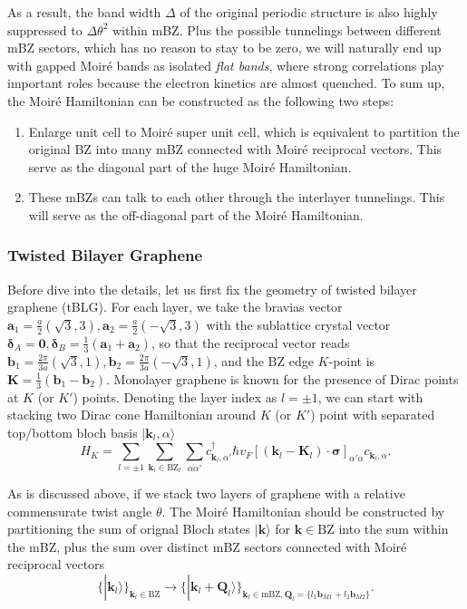 As a result, the band width $\Delta$ of the original periodic structure is also highly suppressed to $\Delta\theta^2$ within mBZ. Plus the possible tunnelings between different mBZ sectors, which has no reason to stay to be zero, we will naturally end up with gapped Moir\'e bands as isolated \emph{flat bands}, where strong correlations play important roles because the electron kinetics are almost quenched. To sum up, the Moir\'e Hamiltonian can be constructed as the following two steps:
\begin{enumerate}
    \item Enlarge unit cell to Moir\'e super unit cell, which is equivalent to partition the original BZ into many mBZ connected with Moir\'e reciprocal vectors. This serve as the diagonal part of the huge Moir\'e Hamiltonian.
    \item These mBZs can talk to each other through the interlayer tunnelings. This will serve as the off-diagonal part of the Moir\'e Hamiltonian.
\end{enumerate}

\subsubsection{Twisted Bilayer Graphene}
Before dive into the details, let us first fix the geometry of twisted bilayer graphene (tBLG). For each layer, we take the bravias vector $\bm a_1=\frac{a}{2}(\sqrt{3},3), \bm a_2=\frac{a}{2}(-\sqrt{3},3)$ with the sublattice crystal vector $\bm\delta_A=\bm 0, \bm\delta_B=\frac{1}{3}(\bm a_1+\bm a_2)$, so that the reciprocal vector reads $\bm b_1=\frac{2\pi}{3a}(\sqrt{3},1), \bm b_2=\frac{2\pi}{3a}(-\sqrt{3},1)$, and the BZ edge $K$-point is $\bm K=\frac{1}{3}(\bm b_1-\bm b_2)$. Monolayer graphene is known for the presence of Dirac points at $K$ (or $K'$) points. Denoting the layer index as $l=\pm1$, we can start with stacking two Dirac cone Hamiltonian around $K$ (or $K'$) point with separated top/bottom bloch basis ${|\bm k_l,\alpha\rangle}$
\begin{equation*}
    H_K = \sum_{l=\pm 1}\sum_{\bm k_l\in\text{BZ}_l}\sum_{\alpha\alpha'} c_{\bm k_l,\alpha'}^\dagger \hbar v_F[(\bm k_l-\bm K_l)\cdot\bm\sigma]_{\alpha'\alpha} c_{\bm k_l,\alpha}.
\end{equation*}

As is discussed above, if we stack two layers of graphene with a relative commensurate twist angle $\theta$. The Moir\'e Hamiltonian should be constructed by partitioning the sum of orignal Bloch states $|\bm k\rangle$ for $\bm k\in\text{BZ}$ into the sum within the mBZ, plus the sum over distinct mBZ sectors connected with Moir\'e reciprocal vectors
\begin{equation*}
    \{|\bm k_l\rangle\}_{\bm k_l\in\text{BZ}}\rightarrow\{|\bm k_l+\bm Q_l\rangle\}_{\bm k_l\in\text{mBZ},\bm Q_l=\{l_1\bm b_{M1}+l_2\bm b_{M2}\}}.
\end{equation*}

